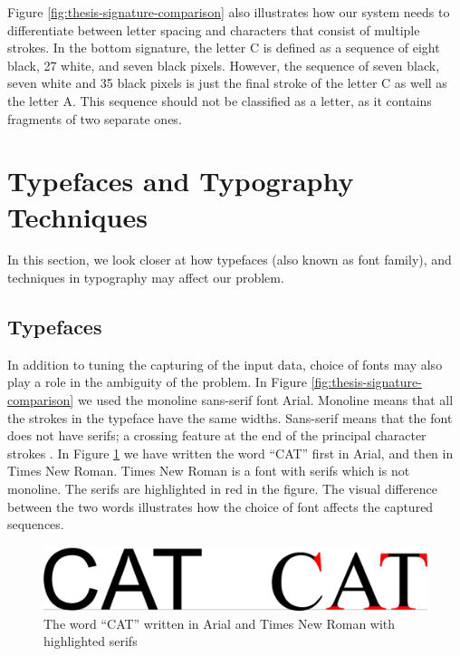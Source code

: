 Figure \ref{fig:thesis-signature-comparison} also illustrates how our system needs to differentiate between letter spacing and characters that consist of multiple strokes. In the bottom signature, the letter C is defined as a sequence of eight black, 27 white, and seven black pixels. However, the sequence of seven black, seven white and 35 black pixels is just the final stroke of the letter C as well as the letter A. This sequence should not be classified as a letter, as it contains fragments of two separate ones.


\section{Typefaces and Typography Techniques}
\label{sec:use_of_fonts}
In this section, we look closer at how typefaces (also known as font family), and techniques in typography may affect our problem.

\subsection{Typefaces}
In addition to tuning the capturing of the input data, choice of fonts may also play a role in the ambiguity of the problem. In Figure \ref{fig:thesis-signature-comparison} we used the monoline sans-serif font Arial. Monoline means that all the strokes in the typeface have the same widths. Sans-serif means that the font does not have serifs; a crossing feature at the end of the principal character strokes \citep[pp.~33--36]{felici2011complete}. In Figure \ref{fig:typeface-comparison} we have written the word ``CAT'' first in Arial, and then in Times New Roman. Times New Roman is a font with serifs which is not monoline. The serifs are highlighted in red in the figure. The visual difference between the two words illustrates how the choice of font affects the captured sequences.

\begin{figure}[h]
    \centering
    \captionsetup{justification=centering}
    \includegraphics[width=1.0\textwidth]{fig/chapter2/typeface_comparison.png}
    \caption{The word ``CAT'' written in Arial and Times New Roman with highlighted serifs}
    \label{fig:typeface-comparison}
\end{figure}

